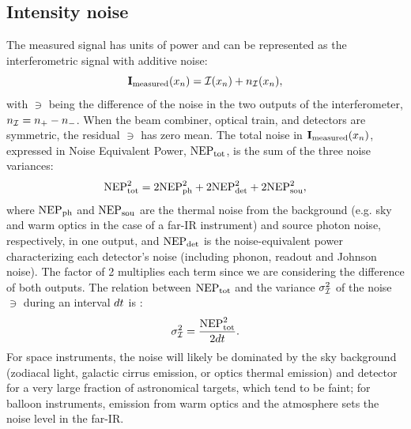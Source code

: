 \subsection{Intensity noise}
\label{sec:noisesource}
The measured signal has units of power and can be represented as the interferometric signal with additive noise:
\begin{equation}
\textrm{\textbf{I}}_\textrm{measured}(x_n) = \mathcal{I}(x_n) + n_{\mathcal{I}}(x_n),
\label{eq:thermalnoise}
\end{equation}
with $\ni$ being the difference of the noise in the two outputs of the interferometer, $n_{\mathcal{I}} = n_+-n_-$. When the beam combiner, optical train, and detectors are symmetric, the residual $\ni$ has zero mean. 
The total noise in $\textrm{\textbf{I}}_\textrm{measured}(x_n)$, expressed in Noise Equivalent Power, $\textrm{NEP}_\textrm{tot}$, is the sum of the three noise variances: 
\begin{equation}
\textrm{NEP}_\textrm{tot}^2 = 2\textrm{NEP}_\textrm{ph}^2 +2\textrm{NEP}_\textrm{det}^2 +  2\textrm{NEP}_\textrm{sou}^2,
\end{equation}
where $\textrm{NEP}_\textrm{ph}$ and $\textrm{NEP}_\textrm{sou}$ are the thermal noise from the background (e.g. sky and warm optics in the case of a far-IR instrument)
and source photon noise, respectively, in one output, and $\textrm{NEP}_\textrm{det}$ is the noise-equivalent power characterizing each detector's noise (including phonon, readout and Johnson noise). The factor of 2 multiplies each term since we are considering the difference of both outputs.
The relation between $\textrm{NEP}_\textrm{tot}$ and the variance $\sigma_{\mathcal{I}}^2$ of the noise $\ni$ during an interval $dt$ is \citep{Sromovsky:2003in}:
\begin{equation}
\label{eq:sigI}
\sigma_{\mathcal{I}}^2 = \frac{\textrm{NEP}_\textrm{tot}^2}{2dt}.
\end{equation}
For space instruments, the noise will likely be dominated by the sky background (zodiacal light, galactic cirrus emission, or optics thermal emission) and detector for a very large fraction of astronomical targets, which tend to be faint; for balloon instruments, emission from
warm optics and the atmosphere sets the noise level in the far-IR.



